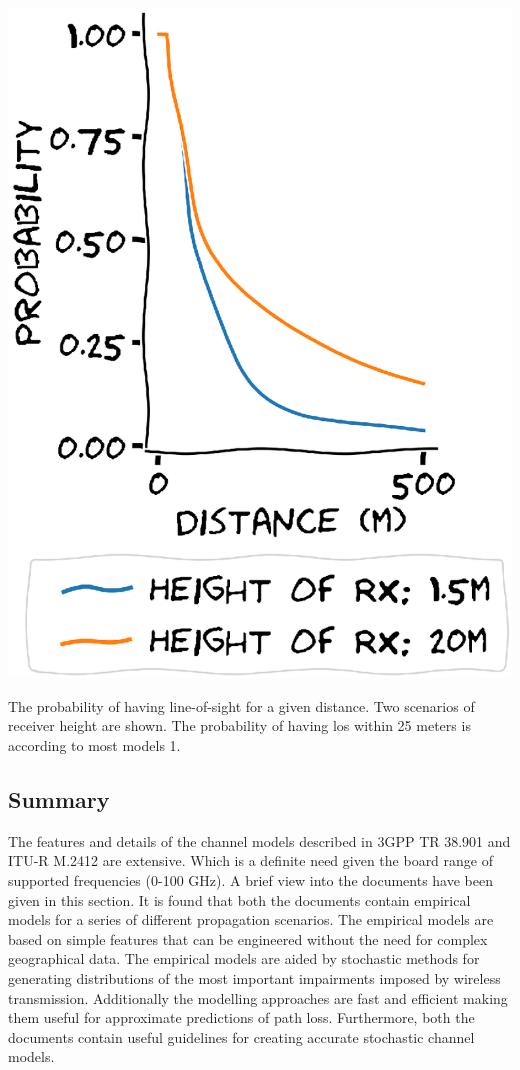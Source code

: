 \begin{marginfigure}
\includegraphics[]{chapters/part_pathloss/figures/LOS_probability.eps}
\caption{The probability of having line-of-sight for a given distance. Two scenarios of receiver height are shown. The probability of having \gls{los} within 25 meters is according to most models 1. }\label{fig:los_probability}
\end{marginfigure}



\subsection{Summary}

The features and details of the channel models described in 3GPP TR 38.901 and ITU-R M.2412 are extensive. Which is a definite need given the board range of supported frequencies (0-100 GHz). A brief view into the documents have been given in this section. It is found that both the documents contain empirical models for a series of different propagation scenarios. The empirical models are based on simple features that can be engineered without the need for complex geographical data. The empirical models are aided by stochastic methods for generating distributions of the most important impairments imposed by wireless transmission. Additionally the modelling approaches are fast and efficient making them useful for approximate predictions of path loss. Furthermore, both the documents contain useful guidelines for creating accurate stochastic channel models. 




